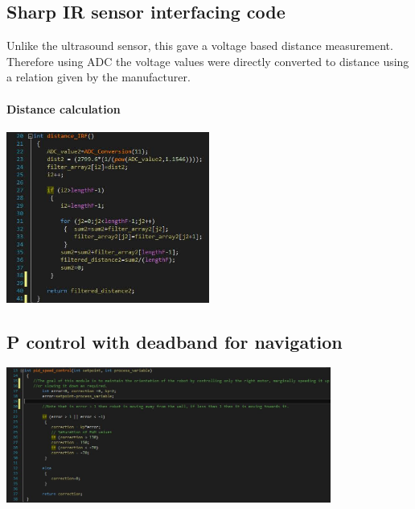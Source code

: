 \documentclass[12pt]{article}
\begin{document}
\subsection{Sharp IR sensor interfacing code}
Unlike the ultrasound sensor, this gave a voltage based distance measurement. Therefore using ADC the voltage values were directly converted to distance using a relation given by the manufacturer.\\

\paragraph{Distance calculation}
\begin{center}
\includegraphics[width=0.5\textwidth]{14.jpg}
\end{center}

\newpage

\subsection{P control with deadband for navigation}
\begin{center}
\includegraphics[width=0.8\textwidth]{15.jpg}
\end{center}
\end{document}
